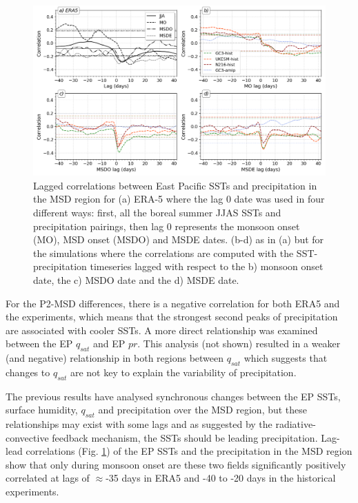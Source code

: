 \begin{figure}[t!]
\includegraphics[width=\linewidth]{figures/sst_regg.png}
\caption[Lagged correlations of East Pacific SSTs]{Lagged correlations between East Pacific SSTs and precipitation in the MSD region for (a) ERA-5 where the lag 0 date was used in four different ways: first, all the boreal summer JJAS SSTs and precipitation pairings, then lag 0 represents the monsoon onset (MO), MSD onset (MSDO) and MSDE dates. (b-d) as in (a) but for the simulations where the correlations are computed with the SST-precipitation timeseries lagged with respect to the b) monsoon onset date, the c) MSDO date and the d) MSDE date.   }
\label{fig:sst_lag}
\end{figure}

For the P2-MSD differences, there is a negative correlation for both ERA5 and the experiments, which means that the strongest second peaks of precipitation are associated with cooler SSTs.  
A more direct relationship was examined between the EP $q_{sat}$ and EP $pr$. This analysis (not shown) resulted in a weaker (and negative) relationship in both regions between $q_{sat}$ which suggests that changes to $q_{sat}$ are not key to explain the variability of precipitation. 

The previous results have analysed synchronous changes between the EP SSTs, surface humidity, $q_{sat}$ and precipitation over the MSD region, but these relationships may exist with some lags and as suggested by the radiative-convective feedback mechanism, the SSTs should be leading precipitation. 
Lag-lead correlations (Fig. \ref{fig:sst_lag}) of the EP SSTs and the precipitation in the MSD region show that only during monsoon onset are these two fields significantly positively correlated at lags of $\approx$-35 days in ERA5 and -40 to -20 days in the historical experiments. 

